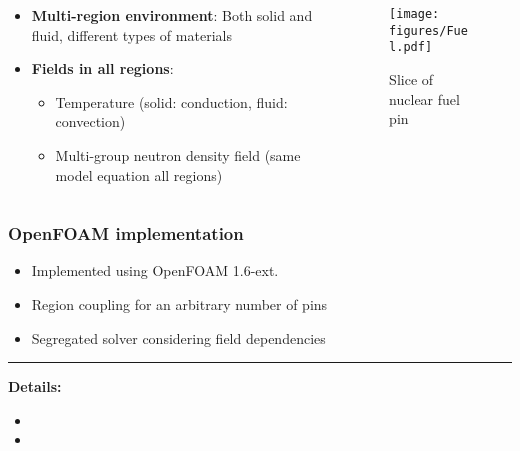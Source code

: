 \documentclass[9pt,handout]{beamer} %
\begin{document}
\begin{frame}%
\begin{columns}
    \begin{column}[]{0.5\textwidth}
    \begin{itemize}\itemsep8pt
        \item \textbf{Multi-region environment}: Both solid and fluid, different types of materials
        \item<2> \textbf{Fields in all regions}:
        \begin{itemize}\itemsep8pt
            \item Temperature (solid: conduction, fluid: convection)
            \item Multi-group neutron density field (same model equation all regions)
        \end{itemize}
    \end{itemize}
    
    \end{column}
    \begin{column}[]{0.5\textwidth}
    \begin{figure}[ht]
        \centering
        \texttt{[image: figures/Fuel.pdf]}
        \caption{Slice of nuclear fuel pin}
    \end{figure}    
    \end{column}
\end{columns}
\end{frame}

\begin{frame}%
\frametitle{OpenFOAM implementation}
\begin{itemize}\itemsep8pt
    \item Implemented using OpenFOAM 1.6-ext.
    \item Region coupling for an arbitrary number of pins
    \item Segregated solver considering field dependencies
\end{itemize}

\vfill
\pause
\rule{0.5\textwidth}{0.5pt}\newline
\scriptsize
{\bf Details:}
\begin{itemize}
    \item {}
    \item {}
\end{itemize}
\end{frame}
\end{document}
